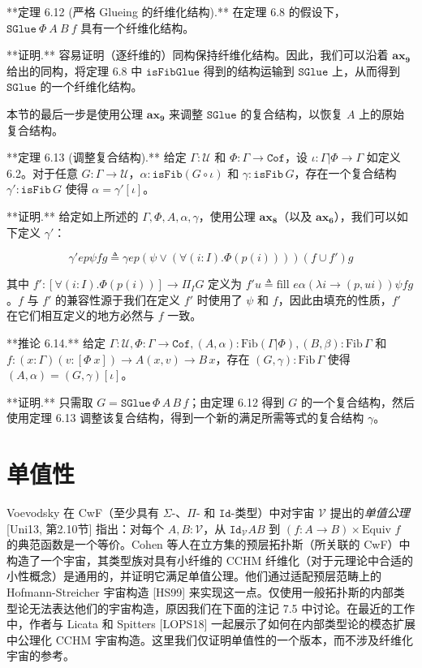 \documentclass{ctexart}
\theoremstyle{plain}
\theoremstyle{definition}
\theoremstyle{definition}
\theoremstyle{definition}
\theoremstyle{definition}
\newcommand{\ax}[1]{\mathbf{ax_{#1}}}
\numberwithin{equation}{section}
\begin{document}
**定理 6.12 (严格 Glueing 的纤维化结构).** 在定理 6.8 的假设下，$\mathtt{SGlue}\ \Phi\ A\ B\ f $ 具有一个纤维化结构。

**证明.** 容易证明（逐纤维的）同构保持纤维化结构。因此，我们可以沿着 $ \ax{9} $ 给出的同构，将定理 6.8 中 $ \mathtt{isFibGlue} $ 得到的结构运输到 $\mathtt{SGlue}$ 上，从而得到 $\mathtt{SGlue}$ 的一个纤维化结构。

本节的最后一步是使用公理 $ \ax{9} $ 来调整 $\mathtt{SGlue}$ 的复合结构，以恢复 $ A $ 上的原始复合结构。

**定理 6.13 (调整复合结构).** 给定 $ \Gamma : \mathcal{U} $ 和 $ \Phi : \Gamma \to \mathtt{Cof} $，设 $ \iota : \Gamma | \Phi \to \Gamma $ 如定义 6.2。对于任意 $ G : \Gamma \to \mathcal{U} $，$ \alpha : \mathtt{isFib}(G \circ \iota) $ 和 $ \gamma : \mathtt{isFib} \, G $，存在一个复合结构 $ \gamma' : \mathtt{isFib} \, G $ 使得 $ \alpha = \gamma'[\iota] $。

**证明.** 给定如上所述的 $ \Gamma, \Phi, A, \alpha, \gamma $，使用公理 $ \ax{8} $（以及 $ \ax{6} $），我们可以如下定义 $ \gamma' $：

\[ \gamma' e p \psi f g \triangleq \gamma e p (\psi \lor (\forall(i : I). \Phi(p(i)))) (f \cup f') g \tag{6.10} \]

其中 $ f' : [\forall(i : I). \Phi(p(i))] \to \Pi_I G $ 定义为 $ f' u \triangleq \text{fill } e \alpha (\lambda i \to (p, u i)) \psi f g $。$ f $ 与 $ f' $ 的兼容性源于我们在定义 $ f' $ 时使用了 $ \psi $ 和 $ f $，因此由填充的性质，$ f' $ 在它们相互定义的地方必然与 $ f $ 一致。

**推论 6.14.** 给定 $ \Gamma : \mathcal{U}, \Phi : \Gamma \to \mathtt{Cof}, (A, \alpha) : \text{Fib}(\Gamma | \Phi), (B, \beta) : \text{Fib} \, \Gamma $ 和 $ f : (x : \Gamma)(v : [\Phi\ x]) \to A(x, v) \to B\,x $，存在 $ (G, \gamma) : \text{Fib} \, \Gamma $ 使得 $ (A, \alpha) = (G, \gamma)[\iota] $。

**证明.** 只需取 $ G = \mathtt{SGlue} \, \Phi \, A \, B \, f $；由定理 6.12 得到 $ G $ 的一个复合结构，然后使用定理 6.13 调整该复合结构，得到一个新的满足所需等式的复合结构 $ \gamma $。

\section{单值性}

Voevodsky 在 CwF（至少具有 $\Sigma$-、$\Pi$- 和 $\mathtt{Id}$-类型）中对宇宙 $\mathcal{V}$ 提出的\textit{单值公理} [Uni13, 第2.10节] 指出：对每个 $A, B : \mathcal{V}$，从 $\mathtt{Id}_\mathcal{V} A B$ 到 $(f : A \to B) \times \text{Equiv } f$ 的典范函数是一个等价。Cohen 等人在立方集的预层拓扑斯（所关联的 CwF）中构造了一个宇宙，其类型族对具有小纤维的 CCHM 纤维化（对于元理论中合适的小性概念）是通用的，并证明它满足单值公理。他们通过适配预层范畴上的 Hofmann-Streicher 宇宙构造 [HS99] 来实现这一点。仅使用一般拓扑斯的内部类型论无法表达他们的宇宙构造，原因我们在下面的注记 7.5 中讨论。在最近的工作中，作者与 Licata 和 Spitters [LOPS18] 一起展示了如何在内部类型论的模态扩展中公理化 CCHM 宇宙构造。这里我们仅证明单值性的一个版本，而不涉及纤维化宇宙的参考。
\end{document}
